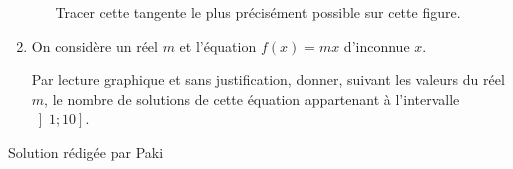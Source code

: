 \begin{enumerate}
\begin{enumerate}
          Tracer cette tangente le plus précisément possible sur cette figure.
     \end{enumerate}
     \item
     On considère un réel $m$ et l'équation $f\left(x\right)=mx$ d'inconnue $x$.
     \par
     Par lecture graphique et sans justification, donner, suivant les valeurs du réel $m$, le nombre de solutions de cette équation appartenant à l'intervalle $\left]1 ; 10\right]$.
\end{enumerate}
\begin{corrige}
     Solution rédigée par Paki
\begin{center}
\end{center}

\end{corrige}

